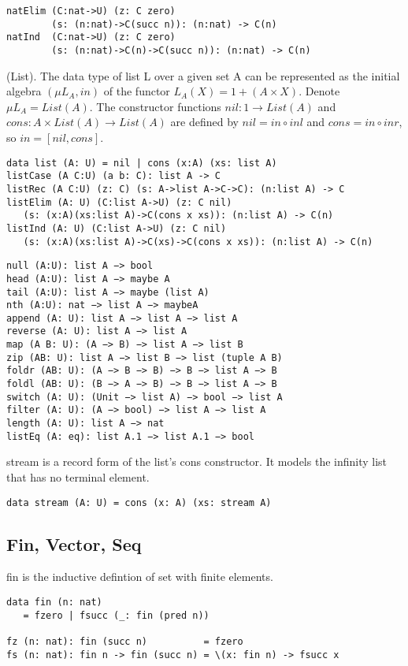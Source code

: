 \begin{lstlisting}
natElim (C:nat->U) (z: C zero)
        (s: (n:nat)->C(succ n)): (n:nat) -> C(n)
natInd  (C:nat->U) (z: C zero)
        (s: (n:nat)->C(n)->C(succ n)): (n:nat) -> C(n)
\end{lstlisting}

\begin{definition} (List).
The data type of list L over a given set A can be represented
as the initial algebra $(\mu L_A, in)$ of the functor $L_A(X) = 1 + (A × X)$.
Denote $\mu L_A = List(A)$. The constructor functions
$nil: 1 \rightarrow List(A)$ and $cons: A \times List(A) \rightarrow
List(A)$ are defined by $nil = in \circ inl$ and $cons = in \circ inr$,
so $in = [nil,cons]$.
\begin{lstlisting}
data list (A: U) = nil | cons (x:A) (xs: list A)
listCase (A C:U) (a b: C): list A -> C
listRec (A C:U) (z: C) (s: A->list A->C->C): (n:list A) -> C
listElim (A: U) (C:list A->U) (z: C nil)
   (s: (x:A)(xs:list A)->C(cons x xs)): (n:list A) -> C(n)
listInd (A: U) (C:list A->U) (z: C nil)
   (s: (x:A)(xs:list A)->C(xs)->C(cons x xs)): (n:list A) -> C(n)
\end{lstlisting}
\begin{lstlisting}
null (A:U): list A −> bool
head (A:U): list A −> maybe A
tail (A:U): list A −> maybe (list A)
nth (A:U): nat −> list A −> maybeA
append (A: U): list A −> list A −> list A
reverse (A: U): list A −> list A
map (A B: U): (A −> B) −> list A −> list B
zip (AB: U): list A −> list B −> list (tuple A B)
foldr (AB: U): (A −> B −> B) −> B −> list A −> B
foldl (AB: U): (B −> A −> B) −> B −> list A −> B
switch (A: U): (Unit −> list A) −> bool −> list A
filter (A: U): (A −> bool) −> list A −> list A
length (A: U): list A −> nat
listEq (A: eq): list A.1 −> list A.1 −> bool
\end{lstlisting}
\end{definition}

stream is a record form of the list's cons constructor. It models the infinity list that has no terminal element.
\begin{lstlisting}
data stream (A: U) = cons (x: A) (xs: stream A)
\end{lstlisting}

\subsection{Fin, Vector, Seq}

fin is the inductive defintion of set with finite elements.
\begin{lstlisting}
data fin (n: nat)
   = fzero | fsucc (_: fin (pred n))

fz (n: nat): fin (succ n)          = fzero
fs (n: nat): fin n -> fin (succ n) = \(x: fin n) -> fsucc x
\end{lstlisting}

